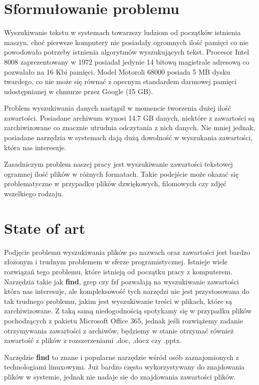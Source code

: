 \section{Sformułowanie problemu}
Wyszukiwanie tekstu w systemach towarzszy ludziom od początków istnienia maszyn,
choć pierwsze komputery nie posiadały ogromnych ilość pamięci co nie powodowało
potrzeby istnienia algorytmów wyszukujących tekst. Procesor Intel 8008 
zaprezentowany w 1972 posiadał jedynie 14 bitową magistrale adresową co 
pozwalało na 16 Kbi pamięci. Model Motoroli 68000 posiada 5 MB dysku twardego,
co nie może się równać z opecnym standardem darmowej pamięci udostępnianej w 
chmurze przez Google (15 GB).

Problem wyszukiwania danych nastąpił w momencie tworzenia dużej ilość zawartości.
Posiadane archiwum wynosi 14.7 GB danych, niektóre z zawartości są 
zarchiwizowane co znacznie utrudnia odczytania z nich danych. Nie mniej jednak,
posiadane narzędzia w systemach dają dużą dowolność w wyszukania zawartości,
która nas interesuje.

Zasadniczym problem naszej pracy jest wyszukiwanie zawartości tekstowej
ogramnej ilość plików w różnych formatach. Takie podejście może okazać się 
problematyczne w przypadku plików dzwiękowych, filomowych czy zdjęć wszelkiego
rodzaju.

\section{State of art}

Podjęcie problemu wyszukiwania plików po nazwach oraz zawartości jest bardzo
złożonym i trudnym problemem w sferze programistycznej. Istnieje wiele rozwiązań
tego problemu, które istnieją od początku pracy z komputerem. Narzędzia takie
jak \textbf{find}, grep czy fzf \cite{bib:internet:Fzf} pozwalają na wyszukiwanie
zawartości która nas interesuje, ale kompleksowość tych narzędzi nie jest 
przystosowana do tak trudnego problemu, jakim jest wyszukiwanie treści w plikach,
które są zarchiwizowane. Z taką samą niedogodnością spotykamy się w przypadku
plików pochodzących z pakietu Microsoft Office 365, jednak jeśli rozwiążemy 
zadanie otrzymywania zawartości z archiwów, będziemy w stanie otrzymać również 
zawartość z plików z rozszerzeniami .doc, .docx czy .pptx.

Narzędzie \textbf{find} to znane i popularne narzędzie wśród osób zaznajomionych z
technologiami linuxowymi. Już bardzo często wykorzystywany do znajdowania plików
w systemie, jednak nie nadaje sie do znajdowania zawartości plików.


